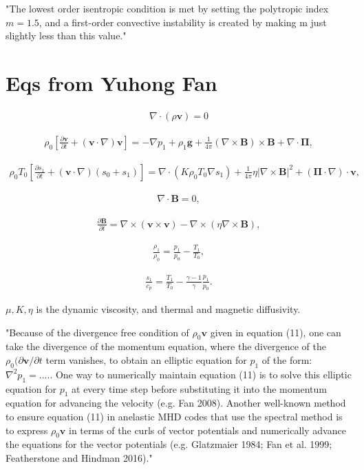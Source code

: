 \documentclass{article}
\begin{document}
"The lowest order isentropic condition is met by setting the polytropic index $m=1.5$, and a first-order convective instability is created by making m just slightly less than this value."


\section{Eqs from Yuhong Fan}

\begin{align}
    \nabla\cdot(\rho\mathbf{v})=0
\end{align}

\begin{align}
    \rho_0\left[\frac{\partial\mathbf{v}}{\partial t}+(\mathbf{v}\cdot\nabla)\mathbf{v}\right]=-\nabla p_1 + \rho_1\mathbf{g} + \frac{1}{4\pi} (\nabla\times\mathbf{B})\times\mathbf{B}+\nabla\cdot\mathbf{\Pi},
\end{align}

\begin{align}
    \rho_0 T_0 \left[\frac{\partial s_1}{\partial t} + (\mathbf{v}\cdot \nabla)(s_0+s_1) \right]
    = \nabla\cdot(K\rho_0T_0\nabla s_1) +\frac{1}{4\pi}\eta |\nabla\times\mathbf{B}|^2 + (\mathbf{\Pi}\cdot\nabla)\cdot\mathbf{v},
\end{align}

\begin{align}
    \nabla\cdot\mathbf{B}=0,
\end{align}

\begin{align}
    \frac{\partial\mathbf{B}}{\partial t} = \nabla\times(\mathbf{v}\times\mathbf{v})-\nabla\times(\eta\nabla\times\mathbf{B}),
\end{align}

\begin{align}
    \frac{\rho_1}{\rho_0} = \frac{p_1}{p_0} - \frac{T_1}{T_0},
\end{align}

\begin{align}
    \frac{s_1}{c_p} = \frac{T_1}{T_0} - \frac{\gamma-1}{\gamma}\frac{p_1}{p_0}.
\end{align}

$\mu,K,\eta$ is the dynamic viscosity, and thermal and magnetic diffusivity.


"Because of the divergence free condition of $\rho_0\mathbf{v}$ given in equation (11), one can take the divergence of the momentum equation, where the divergence of the $\rho_0(\partial\mathbf{v}/\partial t$ term vanishes, to obtain an elliptic equation for $p_1$ of the form: $\nabla^2 p_1=....$. One way to numerically maintain equation (11) is to solve this elliptic equation for $p_1$ at every time step before substituting it into the momentum equation for advancing the velocity (e.g. Fan 2008). Another well-known method to ensure equation (11) in anelastic MHD codes that use the spectral method is to express $\rho_0\mathbf{v}$ in terms of the curls of vector potentials and numerically advance the equations for the vector potentials (e.g. Glatzmaier 1984; Fan et al. 1999; Featherstone and Hindman 2016)."




\end{document}
